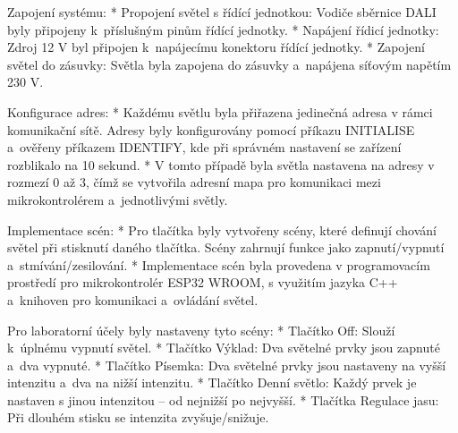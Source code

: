 \medskip\noindent
{\sbf Zapojení systému:}
\begitems
    * {\sbf Propojení světel s řídící jednotkou:} Vodiče sběrnice DALI byly připojeny k~příslušným pinům řídící jednotky.
    * {\sbf Napájení řídicí jednotky:} Zdroj 12 V byl připojen k~napájecímu konektoru řídící jednotky.
    * {\sbf Zapojení světel do zásuvky}: Světla byla zapojena do zásuvky a~napájena síťovým napětím 230 V.
\enditems

\medskip\noindent
{\sbf Konfigurace adres:}
\begitems
    * Každému světlu byla přiřazena jedinečná adresa v rámci komunikační sítě. Adresy
        byly konfigurovány pomocí příkazu INITIALISE a~ověřeny příkazem IDENTIFY, kde při správném nastavení se zařízení rozblikalo na 10 sekund.
    * V tomto případě byla světla nastavena na adresy v rozmezí 0 až 3, čímž
        se vytvořila adresní mapa pro komunikaci mezi mikrokontrolérem a~jednotlivými světly.
\enditems


\medskip
\noindent
{\sbf Implementace scén:}
\begitems
    * Pro tlačítka byly vytvořeny scény, které definují chování světel při stisknutí daného tlačítka.
        Scény zahrnují funkce jako zapnutí/vypnutí a~stmívání/zesilování.
    * Implementace scén byla provedena v programovacím prostředí pro mikrokontrolér ESP32 WROOM,
        s využitím jazyka C++ a~knihoven pro komunikaci a~ovládání světel.
\enditems



\medskip
\noindent
{\sbf Pro laboratorní účely byly nastaveny tyto scény:}
\begitems
    * {\sbf Tlačítko Off:} Slouží k~úplnému vypnutí světel.
    * {\sbf Tlačítko Výklad:} Dva světelné prvky jsou zapnuté a~dva vypnuté.
    * {\sbf Tlačítko Písemka:} Dva světelné prvky jsou nastaveny na vyšší intenzitu a~dva na nižší intenzitu.
    * {\sbf Tlačítko Denní světlo:} Každý prvek je nastaven s jinou intenzitou -- od nejnižší po nejvyšší.
    * {\sbf Tlačítka Regulace jasu:} Při dlouhém stisku se intenzita zvyšuje/snižuje.
\enditems

